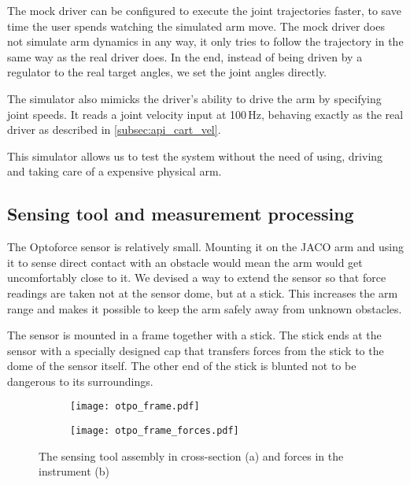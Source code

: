 \documentclass[buriama8_dp.tex]{subfiles}
\begin{document}
The mock driver can be configured to execute the joint trajectories faster, to save time the user spends watching the simulated arm move. The mock driver does not simulate arm dynamics in any way, it only tries to follow the trajectory in the same way as the real driver does. In the end, instead of being driven by a regulator to the real target angles, we set the joint angles directly.

The simulator also mimicks the driver's ability to drive the arm by specifying joint speeds. It reads a joint velocity input at 100\,Hz, behaving exactly as the real driver as described in \ref{subsec:api_cart_vel}.

This simulator allows us to test the system without the need of using, driving and taking care of a expensive physical arm.


\subsection{Sensing tool and measurement processing}
\label{subsec:sense_tool}

The Optoforce sensor is relatively small. Mounting it on the JACO arm and using it to sense direct contact with an obstacle would mean the arm would get uncomfortably close to it. We devised a way to extend the sensor so that force readings are taken not at the sensor dome, but at a stick. This increases the arm range and makes it possible to keep the arm safely away from unknown obstacles.

The sensor is mounted in a frame together with a stick. The stick ends at the sensor with a specially designed cap that transfers forces from the stick to the dome of the sensor itself. The other end of the stick is blunted not to be dangerous to its surroundings.

\begin{figure}[htp]
  \centering

  \begin{subfigure}[t]{0.44\textwidth}
   \texttt{[image: otpo\_frame.pdf]}
   \caption{\label{fig:opto_frame}}
  \end{subfigure}
  \begin{subfigure}[t]{0.44\textwidth}
   \texttt{[image: otpo\_frame\_forces.pdf]}
   \caption{\label{fig:frame_forces}}
  \end{subfigure}

 \caption[Sensing tool]{The sensing tool assembly in cross-section (a) and forces in the instrument (b)}
 \label{fig:opto_frame_fig}
\end{figure}
\end{document}
